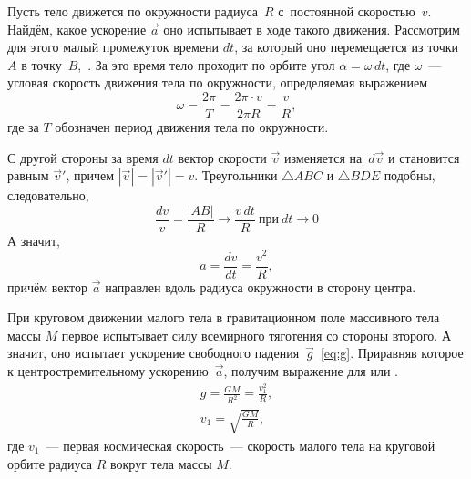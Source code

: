 Пусть тело движется по окружности радиуса~$R$ с~постоянной скоростью~$v$. Найдём, какое ускорение $\vec a$ оно испытывает в ходе такого движения. Рассмотрим для этого малый промежуток времени $dt$, за который оно перемещается из точки~$A$ в точку~$B$,~. За это время тело проходит по орбите угол $\alpha = \omega \, dt$, где $\omega$~--- угловая скорость движения тела по окружности, определяемая выражением
\begin{equation*}
    \omega = \frac{2 \pi}{T} = \frac{ 2\pi \cdot v}{2\pi R} = \frac{v}{R},
\end{equation*}
где за $T$ обозначен период движения тела по окружности.

С другой стороны за время $dt$ вектор скорости $\vec{v}$ изменяется на~$d \vec{v}$ и становится равным $\vec{v}'$, причем $|\vec{v}| = |\vec{v}'| = v$.  Треугольники $\triangle ABC$ и $\triangle BDE$ подобны, следовательно,
\begin{equation*}
    \frac{dv}{v} = \frac{|AB|}{R} \rightarrow \frac{v\,dt}{R}~\text{при}~dt \rightarrow 0
\end{equation*}
 А значит, 
\begin{equation*}
    a = \frac{dv}{dt} = \frac{v^2}{R},
\end{equation*}
причём вектор $\vec{a}$ направлен вдоль радиуса окружности в сторону центра. 

При круговом движении малого тела в гравитационном поле массивного тела массы $M$ первое испытывает силу всемирного тяготения со стороны второго. А значит, оно испытает ускорение свободного падения~$\vec{g}$~\eqref{eq:g}. Приравняв которое к центростремительному ускорению~$\vec{a}$, получим выражение для  или .
\begin{gather}
    g = \frac{G M}{R^2} = \frac{v_1^2}{R},\nonumber\\
    v_1 = \sqrt{\frac{GM}{R}},
\end{gather}
где $v_1$~--- первая космическая скорость~--- скорость малого тела на круговой орбите радиуса $R$ вокруг тела массы $M$.
